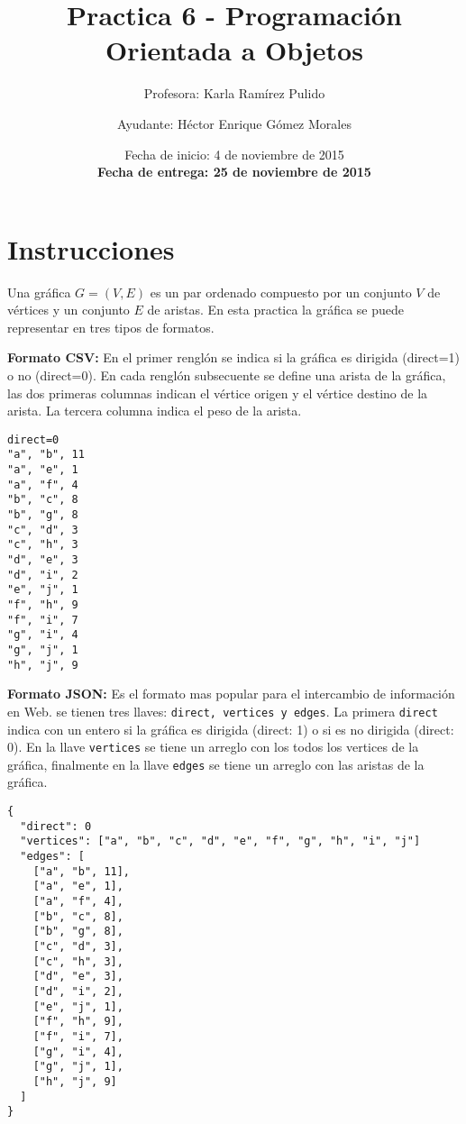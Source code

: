 \documentclass{article}
\author{Profesora: Karla Ramírez Pulido \and
  Ayudante: Héctor Enrique Gómez Morales}
\title{Practica 6 - Programación Orientada a Objetos}
\date{Fecha de inicio: 4 de noviembre de 2015\\
  \textbf{Fecha de entrega: 25 de noviembre de 2015}}
\begin{document}
\maketitle
\section{Instrucciones}

Una gráfica $G = (V, E)$ es un par ordenado compuesto por un conjunto $V$ de vértices y un conjunto $E$ de aristas.
En esta practica la gráfica se puede representar en tres tipos de formatos.


\textbf{Formato CSV:} En el primer renglón se indica si la gráfica es dirigida (direct=1) o no (direct=0).
En cada renglón subsecuente se define una arista de la gráfica, las dos primeras columnas indican
el vértice origen y el vértice destino de la arista. La tercera columna indica el peso de la arista.

\begin{verbatim}
direct=0
"a", "b", 11
"a", "e", 1
"a", "f", 4
"b", "c", 8
"b", "g", 8
"c", "d", 3
"c", "h", 3
"d", "e", 3 
"d", "i", 2
"e", "j", 1
"f", "h", 9
"f", "i", 7
"g", "i", 4
"g", "j", 1
"h", "j", 9
\end{verbatim}


\textbf{Formato JSON:} Es el formato mas popular para el intercambio de información en Web. se tienen tres llaves: \texttt{direct, vertices y edges}. La primera \texttt{direct} indica con un entero si la gráfica es dirigida (direct: 1) o si es no dirigida (direct: 0). En la llave \texttt{vertices} se tiene un arreglo con los todos los vertices de la gráfica, finalmente en la llave \texttt{edges} se tiene un arreglo con las aristas de la gráfica. 

\begin{verbatim}
{
  "direct": 0
  "vertices": ["a", "b", "c", "d", "e", "f", "g", "h", "i", "j"]
  "edges": [
    ["a", "b", 11],
    ["a", "e", 1],
    ["a", "f", 4],
    ["b", "c", 8],
    ["b", "g", 8],
    ["c", "d", 3],
    ["c", "h", 3],
    ["d", "e", 3],
    ["d", "i", 2],
    ["e", "j", 1],
    ["f", "h", 9],
    ["f", "i", 7],
    ["g", "i", 4],
    ["g", "j", 1],
    ["h", "j", 9]
  ]
}
\end{verbatim}
\end{document}
